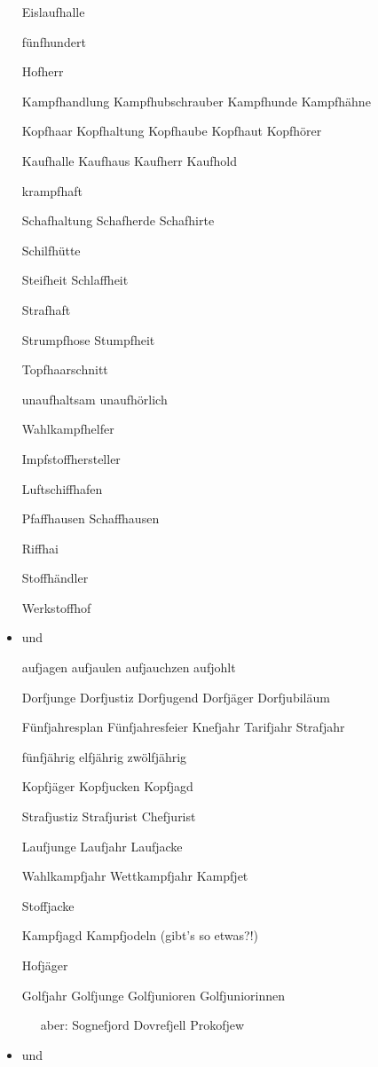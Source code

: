 \begin{itemize}
Eislaufhalle

fünfhundert 

Hofherr

Kampfhandlung Kampfhubschrauber Kampfhunde Kampfhähne

Kopfhaar Kopfhaltung Kopfhaube Kopfhaut Kopfhörer

Kaufhalle Kaufhaus Kaufherr Kaufhold 

krampfhaft

Schafhaltung Schafherde Schafhirte 

Schilfhütte

Steifheit Schlaffheit 

Strafhaft

Strumpfhose Stumpfheit

Topfhaarschnitt

unaufhaltsam unaufhörlich

Wahlkampfhelfer

Impfstoffhersteller 

Luftschiffhafen

Pfaffhausen Schaffhausen

Riffhai

Stoffhändler

Werkstoffhof



\item {} und 


aufjagen aufjaulen aufjauchzen aufjohlt

Dorfjunge Dorfjustiz Dorfjugend Dorfjäger Dorfjubiläum

Fünfjahresplan Fünfjahresfeier Knefjahr Tarifjahr Strafjahr

fünfjährig elfjährig zwölfjährig 

Kopfjäger Kopfjucken Kopfjagd

Strafjustiz Strafjurist Chefjurist

Laufjunge Laufjahr Laufjacke 

Wahlkampfjahr Wettkampfjahr Kampfjet

Stoffjacke

Kampfjagd Kampfjodeln (gibt's so etwas?!)

Hofjäger

Golfjahr Golfjunge Golfjunioren Golfjuniorinnen

\ \ \ aber: Sognefjord Dovrefjell Prokofjew



\item {} und  



\end{itemize}
